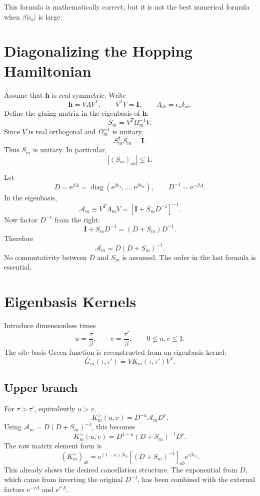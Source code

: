 \documentclass[11pt]{article}
\newcommand{\e}{\mathrm{e}}
\newcommand{\1}{\mathbb{1}}
\newcommand{\bI}{\mathbf{I}}
\newcommand{\bh}{\mathbf{h}}
\newcommand{\diag}{\operatorname{diag}}
\newcommand{\abs}[1]{\left|#1\right|}
\newcommand{\br}[1]{\left(#1\right)}
\newcommand{\sq}[1]{\left[#1\right]}
\begin{document}
This formula is mathematically correct, but it is not the best numerical
formula when \(\beta \abs{\epsilon_a}\) is large.

\section{Diagonalizing the Hopping Hamiltonian}

Assume that \(\bh\) is real symmetric.  Write
\[
    \bh = V\Lambda V^T,
    \qquad
    V^T V=\bI,
    \qquad
    \Lambda_{ab}=\epsilon_a\delta_{ab}.
\]
Define the gluing matrix in the eigenbasis of \(\bh\):
\[
    S_m = V^T\Omega_m^{-1}V.
\]
Since \(V\) is real orthogonal and \(\Omega_m^{-1}\) is unitary,
\[
    S_m^\dagger S_m=\bI.
\]
Thus \(S_m\) is unitary.  In particular,
\[
    \abs{(S_m)_{ab}}\le 1.
\]

Let
\[
    D = \e^{\beta\Lambda}
    =
    \diag\br{\e^{\beta\epsilon_1},\ldots,\e^{\beta\epsilon_N}},
    \qquad
    D^{-1}=\e^{-\beta\Lambda}.
\]
In the eigenbasis,
\[
    \mathcal A_m
    \equiv
    V^T A_m V
    =
    \sq{\bI+S_mD^{-1}}^{-1}.
\]
Now factor \(D^{-1}\) from the right:
\[
    \bI+S_mD^{-1}
    =
    (D+S_m)D^{-1}.
\]
Therefore
\[
    \mathcal A_m
    =
    D(D+S_m)^{-1}.
\]
No commutativity between \(D\) and \(S_m\) is assumed.  The order in the
last formula is essential.

\section{Eigenbasis Kernels}

Introduce dimensionless times
\[
    u=\frac{\tau}{\beta},
    \qquad
    v=\frac{\tau'}{\beta},
    \qquad
    0\le u,v\le 1.
\]
The site-basis Green function is reconstructed from an eigenbasis kernel:
\[
    \bar G_m(\tau,\tau') = V K_m(\tau,\tau') V^T.
\]

\subsection{Upper branch}

For \(\tau>\tau'\), equivalently \(u>v\),
\[
    K_m^>(u,v)
    =
    D^{-u}\mathcal A_m D^v.
\]
Using \(\mathcal A_m=D(D+S_m)^{-1}\), this becomes
\[
    \boxed{
    K_m^>(u,v)
    =
    D^{1-u}(D+S_m)^{-1}D^v.
    }
\]
The raw matrix element form is
\[
    \br{K_m^>}_{ab}
    =
    \e^{(1-u)\beta\epsilon_a}
    \sq{(D+S_m)^{-1}}_{ab}
    \e^{v\beta\epsilon_b}.
\]
This already shows the desired cancellation structure.  The exponential
from \(D\), which came from inverting the original \(D^{-1}\), has been
combined with the external factors \(\e^{-\tau\Lambda}\) and
\(\e^{\tau'\Lambda}\).
\end{document}
